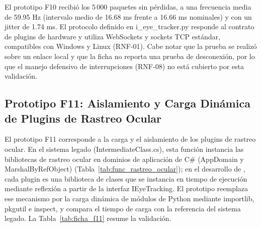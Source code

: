 El prototipo F10 recibió los 5\,000 paquetes sin pérdidas, a una frecuencia media de 59.95 Hz (intervalo medio de 16.68 ms frente a 16.66 ms nominales) y con un jitter de 1.74 ms. El protocolo definido en i\_eye\_tracker.py responde al contrato de plugins de hardware y utiliza WebSockets y sockets TCP estándar, compatibles con Windows y Linux (RNF-01). Cabe notar que la prueba se realizó sobre un enlace local y que la ficha no reporta una prueba de desconexión, por lo que el manejo defensivo de interrupciones (RNF-08) no está cubierto por esta validación.
 
\subsection{Prototipo F11: Aislamiento y Carga Dinámica de Plugins de Rastreo Ocular}
 
El prototipo F11 corresponde a la carga y el aislamiento de los plugins de rastreo ocular. En el sistema legado (IntermediateClass.cs), esta función instancia las bibliotecas de rastreo ocular en dominios de aplicación de C\# (AppDomain y MarshalByRefObject) (Tabla~\ref{tab:func_rastreo_ocular}); en el desarrollo de \cite{estay2020integracion}, cada plugin es una biblioteca de clases que se instancia en tiempo de ejecución mediante reflexión a partir de la interfaz IEyeTracking. El prototipo reemplaza ese mecanismo por la carga dinámica de módulos de Python mediante importlib, pkgutil e inspect, y compara el tiempo de carga con la referencia del sistema legado. La Tabla~\ref{tab:ficha_f11} resume la validación.
 
